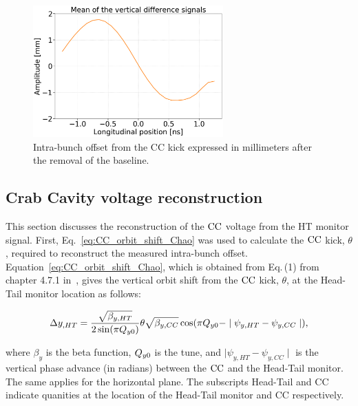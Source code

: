 \begin{figure}[!h]
   \centering         
   \includegraphics[width=0.65\textwidth]{images/Ch4/HT_corrected__20180530_135105_baseline_correction_new_version_CC_post_processing.png}
       \caption{Intra-bunch offset from the CC kick expressed in millimeters after the removal of the baseline.}
       \label{fig:HT_baseline_correction_crabbing_mm}
\end{figure}


 \subsection{Crab Cavity voltage reconstruction}\label{sec:Vcc_calibration}
 This section discusses the reconstruction of the ${\mathrm{CC}}$ voltage from the HT monitor signal. First, Eq.~\eqref{eq:CC_orbit_shift_Chao} was used to calculate the ${\mathrm{CC}}$ kick, $\theta$, required to reconstruct the measured intra-bunch offset. Equation~\eqref{eq:CC_orbit_shift_Chao}, which is obtained from Eq.\,(1) from chapter 4.7.1 in~\cite{Chao:1490001}, gives the vertical orbit shift from the ${\mathrm{CC}}$ kick, $\theta$, at the Head-Tail monitor location as follows:

\begin{equation}\label{eq:CC_orbit_shift_Chao}
   \Delta y_{,HT} = \frac{\sqrt{\beta_{y, HT}}}{2 \sin(\pi {Q_{y0}})} \theta \sqrt{\beta_{y, CC}} \cos(\pi {Q_{y0}} - \mid \psi_{y, HT} - \psi_{y, CC} \mid),
\end{equation}

where $\beta_y$ is the beta function, ${Q_{y0}}$ is the tune, and $\mid \psi_{y, HT} - \psi_{y, CC} \mid$ is the vertical phase advance (in radians) between the ${\mathrm{CC}}$ and the Head-Tail monitor. The same applies for the horizontal plane. The subscripts Head-Tail and CC indicate quanities at the location of the Head-Tail monitor and CC respectively.

